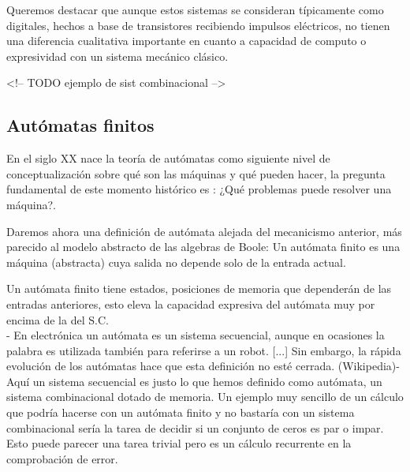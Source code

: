 Queremos destacar que aunque estos sistemas se consideran típicamente como digitales, hechos a base de transistores recibiendo impulsos eléctricos, no tienen una diferencia cualitativa importante en cuanto a capacidad de computo o expresividad con un sistema mecánico clásico.

<!-- TODO  ejemplo de sist combinacional -->



\subsection{ Autómatas finitos}


En el siglo XX nace la teoría de autómatas como siguiente nivel de conceptualización sobre qué son las máquinas y qué pueden hacer, la pregunta fundamental de este momento histórico es : ¿Qué problemas puede resolver una máquina?.

Daremos ahora una definición de autómata alejada del mecanicismo anterior, más parecido al modelo abstracto de las algebras de Boole: Un autómata finito es una máquina (abstracta) cuya salida no depende solo de la entrada actual.

Un autómata finito tiene estados, posiciones de memoria que dependerán de las entradas anteriores, esto eleva la capacidad expresiva del autómata muy por encima de la del S.C. \\

- En electrónica un autómata es un sistema secuencial, aunque en ocasiones la palabra es utilizada también para referirse a un robot. [...] Sin embargo, la rápida evolución de los autómatas hace que esta definición no esté cerrada. (Wikipedia)- \\

Aquí un sistema secuencial es justo lo que hemos definido como autómata, un sistema combinacional dotado de memoria.  Un ejemplo muy sencillo de un cálculo que podría hacerse con un autómata finito y no bastaría con un sistema combinacional sería la tarea de decidir si un conjunto de ceros es par o impar. Esto puede parecer una tarea trivial pero es un cálculo recurrente en la comprobación de error.

